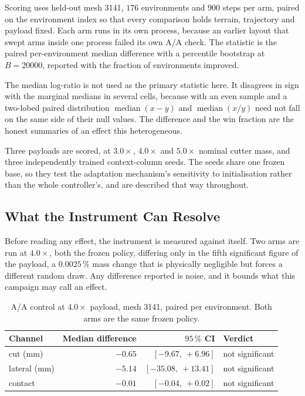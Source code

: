 Scoring uses held-out mesh 3141, $176$ environments and $900$ steps per arm,
paired on the environment index so that every comparison holds terrain,
trajectory and payload fixed. Each arm runs in its own process, because an
earlier layout that swept arms inside one process failed its own A/A check. The
statistic is the paired per-environment median difference with a percentile
bootstrap at $B=20000$, reported with the fraction of environments improved.

The median log-ratio is not used as the primary statistic here. It disagrees in
sign with the marginal medians in several cells, because with an even sample and
a two-lobed paired distribution $\operatorname{median}(x-y)$ and
$\operatorname{median}(x/y)$ need not fall on the same side of their null
values. The difference and the win fraction are the honest summaries of an
effect this heterogeneous.

Three payloads are scored, at $3.0\times$, $4.0\times$ and $5.0\times$ nominal
cutter mass, and three independently trained context-column seeds. The seeds
share one frozen base, so they test the adaptation mechanism's sensitivity to
initialisation rather than the whole controller's, and are described that way
throughout.

\subsection{What the Instrument Can Resolve}

Before reading any effect, the instrument is measured against itself. Two arms
are run at $4.0\times$, both the frozen policy, differing only in the fifth
significant figure of the payload, a $0.0025\,\%$ mass change that is physically
negligible but forces a different random draw. Any difference reported is noise,
and it bounds what this campaign may call an effect.

\begin{table}[H]
  \centering
  \caption{A/A control at $4.0\times$ payload, mesh 3141, paired per
  environment. Both arms are the same frozen policy.}
  \label{tab:eval:aa}
  \small
  \begin{tabular}{@{}lrrl@{}}
    \toprule
    Channel & Median difference & $95\,\%$ CI & Verdict \\
    \midrule
    cut (mm)     & $-0.65$ & $[-9.67,\ +6.96]$   & not significant \\
    lateral (mm) & $-5.14$ & $[-35.08,\ +13.41]$ & not significant \\
    contact      & $-0.01$ & $[-0.04,\ +0.02]$   & not significant \\
    \bottomrule
  \end{tabular}
\end{table}

